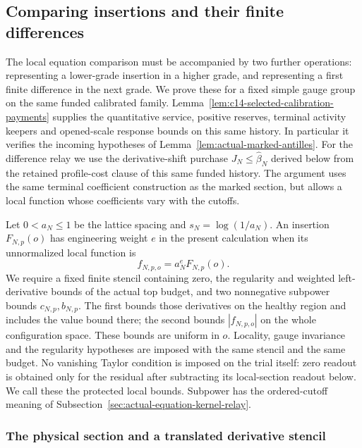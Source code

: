 \subsection{Comparing insertions and their finite differences}
\label{sec:actual-insertion-derivative-relay}

The local equation comparison must be accompanied by two further
operations: representing a lower-grade insertion in a higher grade, and
representing a first finite difference in the next grade. We prove these
for a fixed simple gauge group on the same funded calibrated family.
Lemma~\ref{lem:c14-selected-calibration-payments} supplies the
quantitative service, positive reserves, terminal activity keepers and
opened-scale response bounds on this same history. In particular it
verifies the incoming hypotheses of Lemma~\ref{lem:actual-marked-antilles}. For the difference
relay we use the derivative-shift purchase
$J_N\le\widehat\beta_N$ derived below from the retained profile-cost
clause of this same funded history. The argument
uses the same terminal coefficient construction as the marked section,
but allows a local function whose coefficients vary with the cutoffs.

Let $0<a_N\le1$ be the lattice spacing and $s_N=\log(1/a_N)$. An insertion
$F_{N,p}(o)$ has engineering weight $e$ in the present calculation when
its unnormalized local function is
\[
                         f_{N,p,o}=a_N^eF_{N,p}(o).
\]
We require a fixed finite stencil containing zero, the regularity and
weighted left-derivative bounds of the actual top budget, and two
nonnegative subpower bounds $c_{N,p},b_{N,p}$. The first bounds those
derivatives on the healthy region and includes the value bound there;
the second bounds $|f_{N,p,o}|$ on the whole configuration space. These
bounds are uniform in $o$. Locality, gauge invariance and the regularity hypotheses are imposed
with the same stencil and the same budget. No vanishing Taylor
condition is imposed on the trial itself: zero readout is obtained
only for the residual after subtracting its local-section readout below. We call these the protected local
bounds. Subpower has the ordered-cutoff meaning of
Subsection~\ref{sec:actual-equation-kernel-relay}.

\subsubsection{The physical section and a translated derivative stencil}

